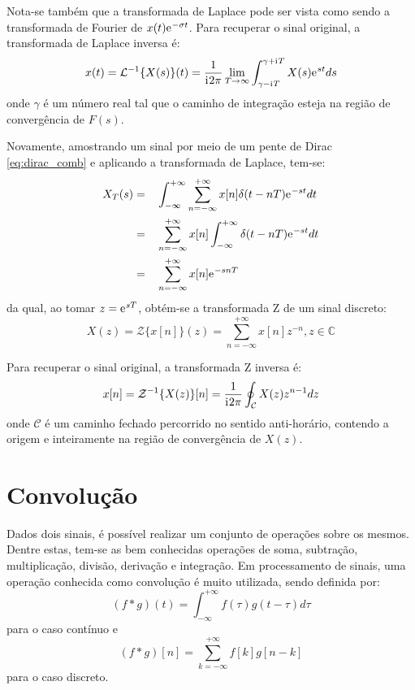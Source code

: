 \documentclass[12pt,a4paper]{report}
\newcommand{\I}{{\mathrm{i}\mkern1mu}}
\newcommand{\euler}{{\mathrm{e}\mkern1mu}}
\begin{document}
  Nota-se também que a transformada de Laplace pode ser vista como sendo a transformada de Fourier de
  $x(t) \euler^{-\sigma t}$. Para recuperar o sinal original, a transformada de Laplace inversa é:
  \begin{equation}
    x(t) = \mathcal{L}^{-1}\{X(s)\}(t) = \frac{1}{\I 2 \pi} \lim_{T \rightarrow \infty}
    \int_{\gamma - \I T}^{\gamma + \I T} X(s) \euler^{s t} ds
  \end{equation}
  onde $\gamma$ é um número real tal que o caminho de integração esteja na região de convergência de $F(s)$.

  Novamente, amostrando um sinal por meio de um pente de Dirac \eqref{eq:dirac_comb} e aplicando
  a transformada de Laplace, tem-se:
  \begin{equation}
    \begin{split}
      X_T(s) = &\quad \int_{-\infty}^{+\infty} \sum_{n = -\infty}^{+\infty} x[n] \delta(t - n T) \euler^{-s t} dt
      \\= &\quad \sum_{n = -\infty}^{+\infty} x[n] \int_{-\infty}^{+\infty} \delta(t - n T) \euler^{-s t} dt
      \\= &\quad \sum_{n = -\infty}^{+\infty} x[n] \euler^{-s n T}
    \end{split}
  \end{equation}
  da qual, ao tomar $z = \euler^{s T}$, obtém-se a transformada Z de um sinal discreto:
  \begin{equation}
    X(z) = \mathcal{Z}\{x[n]\}(z) = \sum_{n = -\infty}^{+\infty} x[n] z^{-n}, z \in \mathbb{C}
  \end{equation}

  Para recuperar o sinal original, a transformada Z inversa é:
  \begin{equation}
    x[n] = \mathcal{Z}^{-1}\{X(z)\}[n] = \frac{1}{\I 2 \pi} \oint_{\mathcal{C}} X(z) z^{n - 1} dz
  \end{equation}
  onde $\mathcal{C}$ é um caminho fechado percorrido no sentido anti-horário, contendo a origem e inteiramente
  na região de convergência de $X(z)$.

\section{Convolução}
  Dados dois sinais, é possível realizar um conjunto de operações sobre os mesmos. Dentre estas, tem-se as bem
  conhecidas operações de soma, subtração, multiplicação, divisão, derivação e integração. Em processamento
  de sinais, uma operação conhecida como convolução é muito utilizada, sendo definida por:
  \begin{equation}
    (f \ast g)(t) = \int_{-\infty}^{+\infty} f(\tau) g(t - \tau) d\tau
  \end{equation}
  para o caso contínuo e
  \begin{equation}
    (f \ast g)[n] = \sum_{k = -\infty}^{+\infty} f[k] g[n - k]
  \end{equation}
  para o caso discreto.
\end{document}
